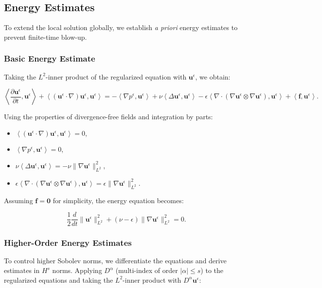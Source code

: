 \documentclass[12pt]{article}
\begin{document}
\subsection{Energy Estimates}
To extend the local solution globally, we establish \textit{a priori} energy estimates to prevent finite-time blow-up.

\subsubsection{Basic Energy Estimate}
Taking the \(L^2\)-inner product of the regularized equation with \(\mathbf{u}^\epsilon\), we obtain:

\[
\left\langle \frac{\partial \mathbf{u}^\epsilon}{\partial t}, \mathbf{u}^\epsilon \right\rangle + \left\langle (\mathbf{u}^\epsilon \cdot \nabla)\mathbf{u}^\epsilon, \mathbf{u}^\epsilon \right\rangle = -\left\langle \nabla p^\epsilon, \mathbf{u}^\epsilon \right\rangle + \nu \left\langle \Delta \mathbf{u}^\epsilon, \mathbf{u}^\epsilon \right\rangle - \epsilon \left\langle \nabla \cdot (\nabla \mathbf{u}^\epsilon \otimes \nabla \mathbf{u}^\epsilon), \mathbf{u}^\epsilon \right\rangle + \left\langle \mathbf{f}, \mathbf{u}^\epsilon \right\rangle.
\]

Using the properties of divergence-free fields and integration by parts:

\begin{itemize}
    \item \(\left\langle (\mathbf{u}^\epsilon \cdot \nabla)\mathbf{u}^\epsilon, \mathbf{u}^\epsilon \right\rangle = 0\),
    \item \(\left\langle \nabla p^\epsilon, \mathbf{u}^\epsilon \right\rangle = 0\),
    \item \(\nu \left\langle \Delta \mathbf{u}^\epsilon, \mathbf{u}^\epsilon \right\rangle = -\nu \|\nabla \mathbf{u}^\epsilon\|_{L^2}^2\),
    \item \(\epsilon \left\langle \nabla \cdot (\nabla \mathbf{u}^\epsilon \otimes \nabla \mathbf{u}^\epsilon), \mathbf{u}^\epsilon \right\rangle = \epsilon \|\nabla \mathbf{u}^\epsilon\|_{L^2}^2\).
\end{itemize}

Assuming \(\mathbf{f} = \mathbf{0}\) for simplicity, the energy equation becomes:

\[
\frac{1}{2} \frac{d}{dt} \|\mathbf{u}^\epsilon\|_{L^2}^2 + (\nu - \epsilon) \|\nabla \mathbf{u}^\epsilon\|_{L^2}^2 = 0.
\]

\subsubsection{Higher-Order Energy Estimates}
To control higher Sobolev norms, we differentiate the equations and derive estimates in \(H^s\) norms. Applying \(D^\alpha\) (multi-index of order \(|\alpha| \leq s\)) to the regularized equations and taking the \(L^2\)-inner product with \(D^\alpha \mathbf{u}^\epsilon\):
\end{document}
